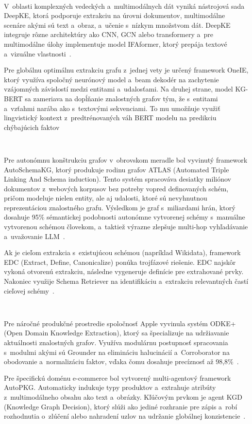 \

V~oblasti komplexných vedeckých a~multimodálnych dát vyniká nástrojová sada DeepKE, ktorá podporuje extrakciu na úrovni dokumentov, multimodálne scenáre akými sú text a~obraz, a~učenie s~nízkym množstvom dát. DeepKE integruje rôzne architektúry ako CNN, GCN alebo transformery a~pre multimodálne úlohy implementuje model IFAformer, ktorý prepája textové a~vizuálne vlastnosti~\cite{deepke2023}.

Pre globálnu optimálnu extrakciu grafu z~jednej vety je určený framework OneIE, ktorý využíva spoločný neurónový model a~beam dekodér na zachytenie vzájomných závislostí medzi entitami a~udalosťami. Na druhej strane, model KG-BERT sa zameriava na dopĺňanie znalostných grafov tým, že s~entitami a~vzťahmi narába ako s~textovými sekvenciami. To mu umožňuje využiť lingvistický kontext z~predtrénovaných váh BERT modelu na predikciu chýbajúcich faktov~\cite{kgbert2019, oneie2020}

\

Pre autonómnu konštrukciu grafov v~obrovskom meradle bol vyvinutý framework AutoSchemaKG, ktorý produkuje rodinu grafov ATLAS (Automated Triple Linking And Schema induction). Tento systém spracováva desiatky miliónov dokumentov z~webových korpusov bez potreby vopred definovaných schém, pričom modeluje nielen entity, ale aj udalosti, ktoré sú nevyhnutnou reprezentáciou znalostného grafu. Výsledkom je graf s~miliardami hrán, ktorý dosahuje 95\% sémantickej podobnosti autonómne vytvorenej schémy s~manuálne vytvorenou schémou človekom, a~taktiež výrazne zlepšuje multi-hop vyhľadávanie a~uvažovanie LLM~\cite{autoschemakg2025}.

Ak je cieľom extrakcia s~existujúcou schémou (napríklad Wikidata), framework EDC (Extract, Define, Canonicalize) ponúka trojfázové riešenie. EDC najskôr vykoná otvorenú extrakciu, následne vygeneruje definície pre extrahované prvky. Nakoniec využije Schema Retriever na identifikáciu a~extrakciu relevantných častí cieľovej schémy~\cite{edc2024}.

\

Pre náročné produkčné prostredie spoločnosť Apple vyvinula systém ODKE+ (Open Domain Knowledge Extraction), ktorý sa špecializuje na udržiavanie aktuálnosti znalostných grafov. Využíva modulárnu postupnosť spracovania s~modulmi akými sú Grounder na elimináciu halucinácií a~Corroborator na obodovanie a~normalizáciu faktov, vďaka čomu dosahuje precíznosť až 98,8\%~\cite{odkeplus2025}.

Pre špecifickú doménu e-commerce bol vytvorený multi-agentový framework AutoPKG. Automaticky indukuje typy produktov a~extrahuje atribúty z~multimodálneho obsahu ako text a~obrázky. Kľúčovým prvkom je agent KGD (Knowledge Graph Decision), ktorý slúži ako jediné rozhranie pre zápis a~robí rozhodnutia o~zlúčení alebo nahradení uzlov na udržanie globálnej konzistencie~\cite{autopkg2026}. 

